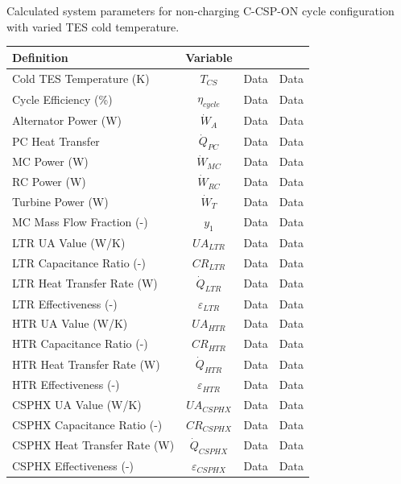 \begin{paracol}{2}
\begin{specialtable}[H] 
    \caption{Calculated system parameters for non-charging C-CSP-ON cycle configuration with varied TES cold temperature. \label{tab-c-csp-on}}
    \begin{tabular}{lccc}
    \toprule
    \textbf{Definition} & \textbf{Variable} &  &\\
    \midrule
    Cold TES Temperature (K)	&	$T_{CS}$	&	Data	&	Data	\\
    Cycle Efficiency (\%)	&	$\eta_{cycle}$	&	Data	&	Data	\\
    Alternator Power (W)	&	$\dot{W}_{A}$	&	Data	&	Data	\\
    PC Heat Transfer	&	$\dot{Q}_{PC}$	&	Data	&	Data	\\
    MC Power (W)	&	$\dot{W}_{MC}$	&	Data	&	Data	\\
    RC Power (W)	&	$\dot{W}_{RC}$	&	Data	&	Data	\\
    Turbine Power (W)	&	$\dot{W}_{T}$	&	Data	&	Data	\\
    MC Mass Flow Fraction (-)	&	$y_{1}$	&	Data	&	Data	\\
    LTR UA Value (W/K)	&	$UA_{LTR}$	&	Data	&	Data	\\
    LTR Capacitance Ratio (-)	&	$CR_{LTR}$	&	Data	&	Data	\\
    LTR Heat Transfer Rate (W)	&	$\dot{Q}_{LTR}$	&	Data	&	Data	\\
    LTR Effectiveness (-)	&	$\varepsilon_{LTR}$	&	Data	&	Data	\\
    HTR UA Value (W/K)	&	$UA_{HTR}$	&	Data	&	Data	\\
    HTR Capacitance Ratio (-)	&	$CR_{HTR}$	&	Data	&	Data	\\
    HTR Heat Transfer Rate (W)	&	$\dot{Q}_{HTR}$	&	Data	&	Data	\\
    HTR Effectiveness (-)	&	$\varepsilon_{HTR}$	&	Data	&	Data	\\
    CSPHX UA Value (W/K)	&	$UA_{CSPHX}$	&	Data	&	Data	\\
    CSPHX Capacitance Ratio (-)	&	$CR_{CSPHX}$	&	Data	&	Data	\\
    CSPHX Heat Transfer Rate (W)	&	$\dot{Q}_{CSPHX}$	&	Data	&	Data	\\
    CSPHX Effectiveness (-)	&	$\varepsilon_{CSPHX}$	&	Data	&	Data	\\
    \bottomrule
    \end{tabular}\\
\end{specialtable}


\end{paracol}
